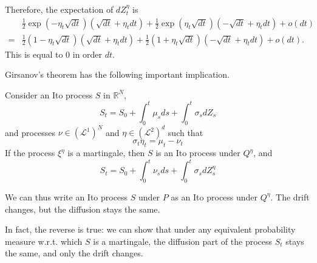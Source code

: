 \documentclass[\topdir/lecture\_notes.tex]{subfiles}
\begin{document}
Therefore, the expectation of $d Z_{t}^{\eta}$ is
\begin{equation*}
\begin{aligned}
& \frac{1}{2} \exp \left(-\eta_{t} \sqrt{d t}\right)\left(\sqrt{d t}+\eta_{t} d t\right)+\frac{1}{2} \exp \left(\eta_{t} \sqrt{d t}\right)\left(-\sqrt{d t}+\eta_{t} d t\right)+o(d t) \\
= & \frac{1}{2}\left(1-\eta_{t} \sqrt{d t}\right)\left(\sqrt{d t}+\eta_{t} d t\right)+\frac{1}{2}\left(1+\eta_{t} \sqrt{d t}\right)\left(-\sqrt{d t}+\eta_{t} d t\right)+o(d t) .
\end{aligned}
\end{equation*}
This is equal to 0 in order $dt$.

Girsanov's theorem has the following important implication.

\begin{proposition}\label{prop: prop_271}
Consider an Ito process $S$ in $\mathbb{R}^{N}$,
\begin{equation*}
S_{t}=S_{0}+\int_{0}^{t} \mu_{s} d s+\int_{0}^{t} \sigma_{s} d Z_{s}
\end{equation*}
and processes $\nu \in\left(\mathcal{L}^{1}\right)^{N}$ and $\eta \in\left(\mathcal{L}^{2}\right)^{d}$ such that
\begin{equation*}
\sigma_{t} \eta_{t}=\mu_{t}-\nu_{t}
\end{equation*}
If the process $\xi^{\eta}$ is a martingale, then $S$ is an Ito process under $Q^{\eta}$, and
\begin{equation*}
S_{t}=S_{0}+\int_{0}^{t} \nu_{s} d s+\int_{0}^{t} \sigma_{s} d Z_{s}^{\eta}
\end{equation*}
\end{proposition}
We can thus write an Ito process $S$ under $P$ as an Ito process under $Q^{\eta}$. The drift changes, but the diffusion stays the same.

In fact, the reverse is true: we can show that under any equivalent probability measure w.r.t. which $S$ is a martingale, the diffusion part of the process $S_{t}$ stays the same, and only the drift changes.
\end{document}
